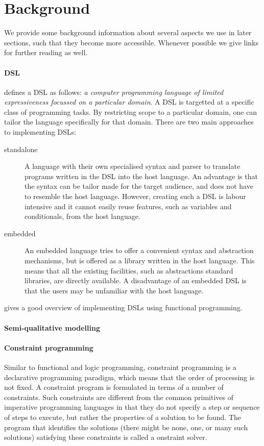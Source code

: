 \section{Background}
\label{sec:background}

We provide some background information about several aspects we use in later
sections, such that they become more accessible. Whenever possible we give links 
for further reading as well.

\paragraph{\acl{DSL}} \citet{fowler} defines a \ac{DSL} as follows:
\emph{a computer programming language of limited expressiveness focussed on a
particular domain}. A \ac{DSL} is targetted at a specific class of programming
tasks. By restricting scope to a particular domain, one can tailor the language
specifically for that domain. There are two main approaches to implementing
\acp{DSL}: 
\begin{description}
  \item[standalone] A language with their own specialised syntax and parser to
  translate programs written in the \ac{DSL} into the host language. An
  advantage is that the syntax can be tailor made for the target audience, and
  does not have to resemble the host language. However, creating such a \ac{DSL}
  is labour intensive and it cannot easily reuse features, such as variables and
  conditionals, from the host language. 
 \item[embedded] An embedded language tries to offer a convenient syntax and
   abstraction mechanisms, but is offered as a library written in the host 
   language. This means that all the existing facilities, such as abstractions 
   standard libraries, are directly available. A disadvantage of an embedded 
   \ac{DSL} is that the users may be unfamiliar with the host language. 
\end{description}
\citet{Gibbons2015} gives a good overview of implementing \acp{DSL} using
functional programming.

\paragraph{Semi-qualitative modelling} 

\paragraph{Constraint programming} Similar to functional and logic programming,
constraint programming is a declarative programming paradigm, which means that
the order of processing is not fixed. A constraint program is formulated in
terms of a number of constraints. Such constraints are different from the common
primitives of imperative programming languages in that they do not specify a
step or sequence of steps to execute, but rather the properties of a solution to
be found. The program that identifies the solutions (there might be none, one,
or many such solutions) satisfying these constraints is called a onstraint
solver.

